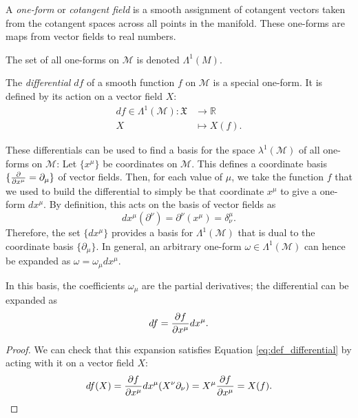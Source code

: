 \begin{definition}
  A \emph{one-form} or \emph{cotangent field} is a smooth assignment of cotangent vectors taken from the cotangent spaces across all points in the manifold.
  These one-forms are maps from vector fields to real numbers.
\end{definition}
\begin{notation}[]
  The set of all one-forms on $\mathcal{M}$ is denoted $\Lambda^1(M)$.
\end{notation}

\begin{definition}[differential]
  The \emph{differential} $df$ of a smooth function $f$ on $\mathcal{M}$ is a special one-form. It is defined by its action on a vector field $X$:
  \begin{equation}
    \label{eq:def_differential}
    \begin{split}
      df \in \Lambda^1(\mathcal{M}) \colon \mathfrak{X} &\to \mathbb{R} \\
      X &\mapsto X(f).
    \end{split}
  \end{equation}
\end{definition}
These differentials can be used to find a basis for the space $\lambda^1(\mathcal{M})$ of all one-forms on $\mathcal{M}$:
Let $\{x^\mu\}$ be coordinates on $\mathcal{M}$. This defines a coordinate basis $\{\pdv{}{x^\mu} = \partial_\mu \}$ of vector fields.
Then, for each value of $\mu$, we take the function $f$ that we used to build the differential to simply be that coordinate $x^\mu$ to give a one-form $dx^\mu$. By definition, this acts on the basis of vector fields as
\begin{equation}
  dx^\mu (\partial^\nu) = \partial^\nu(x^\mu) = \delta^\mu_\nu.
\end{equation}
Therefore, the set $\{dx^\mu\}$ provides a basis for $\Lambda^1 (\mathcal{M})$ that is dual to the coordinate basis $\{\partial_\mu\}$.
In general, an arbitrary one-form $\omega \in \Lambda^1(\mathcal{M})$ can hence be expanded as $\omega = \omega_\mu dx^\mu$.
\begin{claim}
  In this basis, the coefficients $\omega_\mu$ are the partial derivatives; the differential can be expanded as
  \begin{equation}
    df = \pdv{f}{x^\mu} dx^\mu.
  \end{equation}
\end{claim}
\begin{proof}
  We can check that this expansion satisfies Equation \eqref{eq:def_differential} by acting with it on a vector field $X$:
  \begin{equation}
    df(X) = \pdv{f}{x^\mu} dx^\mu (X^\nu \partial_\nu) = X^\mu \pdv{f}{x^\mu} = X(f).
  \end{equation}
\end{proof}
